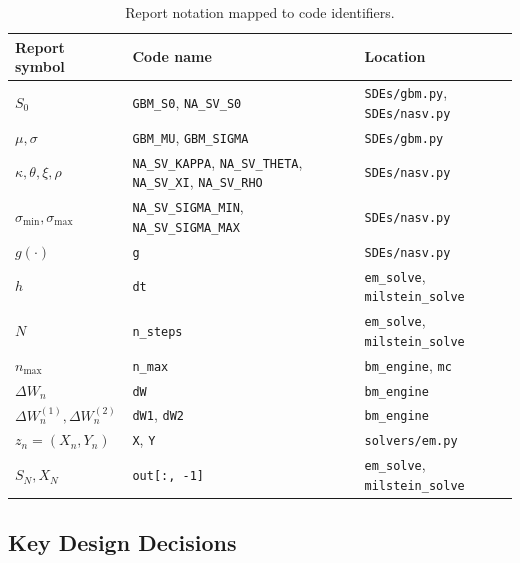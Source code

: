 \documentclass[11pt,a4paper]{article}
\theoremstyle{definition}
\theoremstyle{remark}
\begin{document}
\begin{table}[H]
\centering
\small
\begin{tabular}{lll}
\toprule
\textbf{Report symbol} & \textbf{Code name} & \textbf{Location} \\
\midrule
$S_0$                         & \texttt{GBM\_S0}, \texttt{NA\_SV\_S0}
                              & \texttt{SDEs/gbm.py}, \texttt{SDEs/nasv.py} \\
$\mu, \sigma$                 & \texttt{GBM\_MU}, \texttt{GBM\_SIGMA}
                              & \texttt{SDEs/gbm.py} \\
$\kappa, \theta, \xi, \rho$   & \texttt{NA\_SV\_KAPPA}, \texttt{NA\_SV\_THETA},
                                \texttt{NA\_SV\_XI}, \texttt{NA\_SV\_RHO}
                              & \texttt{SDEs/nasv.py} \\
$\sigma_{\min}, \sigma_{\max}$ & \texttt{NA\_SV\_SIGMA\_MIN},
                                 \texttt{NA\_SV\_SIGMA\_MAX}
                              & \texttt{SDEs/nasv.py} \\
$g(\cdot)$                    & \texttt{g} & \texttt{SDEs/nasv.py} \\
$h$                           & \texttt{dt}
                              & \texttt{em\_solve}, \texttt{milstein\_solve} \\
$N$                           & \texttt{n\_steps}
                              & \texttt{em\_solve}, \texttt{milstein\_solve} \\
$n_{\max}$                    & \texttt{n\_max}
                              & \texttt{bm\_engine}, \texttt{mc} \\
$\Delta W_n$                  & \texttt{dW} & \texttt{bm\_engine} \\
$\Delta W_n^{(1)}, \Delta W_n^{(2)}$ & \texttt{dW1}, \texttt{dW2}
                              & \texttt{bm\_engine} \\
$z_n = (X_n, Y_n)$            & \texttt{X}, \texttt{Y} & \texttt{solvers/em.py} \\
$S_N, X_N$                    & \texttt{out[:, -1]}
                              & \texttt{em\_solve}, \texttt{milstein\_solve} \\
\bottomrule
\end{tabular}
\caption{Report notation mapped to code identifiers.}
\label{tab:notation-code}
\end{table}

\subsection{Key Design Decisions}
\label{sec:key-decisions}
\end{document}
